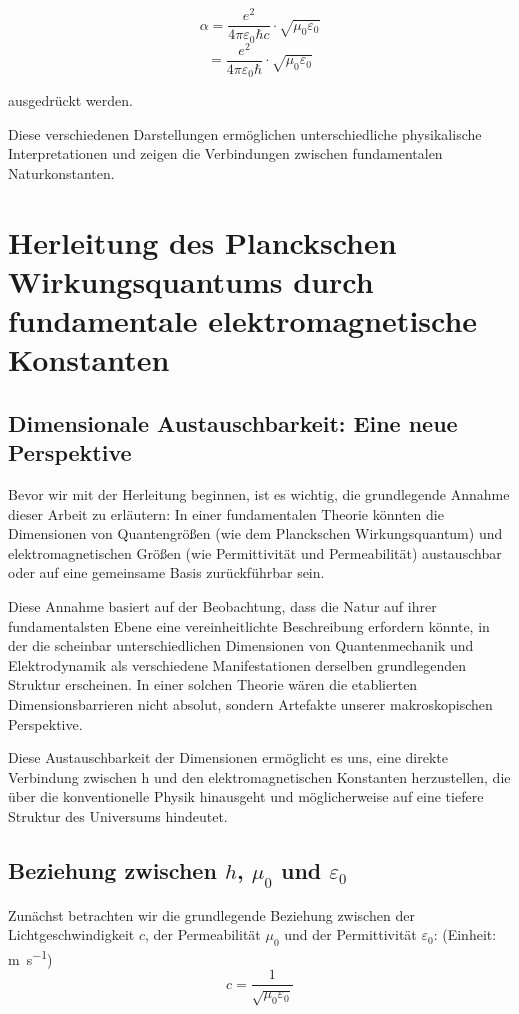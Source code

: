 \documentclass{article}
\begin{document}
	$$\alpha = \frac{e^2}{4\pi\varepsilon_0\hbar c} \cdot \sqrt{\mu_0\varepsilon_0}$$
	$$= \frac{e^2}{4\pi\varepsilon_0\hbar} \cdot \sqrt{\mu_0\varepsilon_0}$$
	
	ausgedrückt werden.
	
	Diese verschiedenen Darstellungen ermöglichen unterschiedliche physikalische Interpretationen und zeigen die Verbindungen zwischen fundamentalen Naturkonstanten.
	
	
	\section{Herleitung des Planckschen Wirkungsquantums durch fundamentale elektromagnetische Konstanten}
	
	\subsection{Dimensionale Austauschbarkeit: Eine neue Perspektive}
	
	Bevor wir mit der Herleitung beginnen, ist es wichtig, die grundlegende Annahme dieser Arbeit zu erläutern: In einer fundamentalen Theorie könnten die Dimensionen von Quantengrößen (wie dem Planckschen Wirkungsquantum) und elektromagnetischen Größen (wie Permittivität und Permeabilität) austauschbar oder auf eine gemeinsame Basis zurückführbar sein.
	
	Diese Annahme basiert auf der Beobachtung, dass die Natur auf ihrer fundamentalsten Ebene eine vereinheitlichte Beschreibung erfordern könnte, in der die scheinbar unterschiedlichen Dimensionen von Quantenmechanik und Elektrodynamik als verschiedene Manifestationen derselben grundlegenden Struktur erscheinen. In einer solchen Theorie wären die etablierten Dimensionsbarrieren nicht absolut, sondern Artefakte unserer makroskopischen Perspektive.
	
	Diese Austauschbarkeit der Dimensionen ermöglicht es uns, eine direkte Verbindung zwischen h und den elektromagnetischen Konstanten herzustellen, die über die konventionelle Physik hinausgeht und möglicherweise auf eine tiefere Struktur des Universums hindeutet.
	
	\subsection{Beziehung zwischen $h$, $\mu_0$ und $\varepsilon_0$}
	
	Zunächst betrachten wir die grundlegende Beziehung zwischen der Lichtgeschwindigkeit $c$, der Permeabilität $\mu_0$ und der Permittivität $\varepsilon_0$:
	(Einheit: \si{\meter\per\second})	
	$$c = \frac{1}{\sqrt{\mu_0\varepsilon_0}}$$
	
\end{document}
